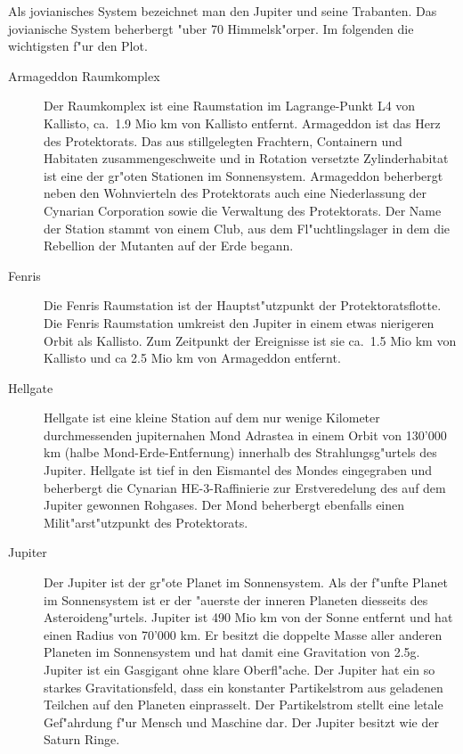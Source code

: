 
Als jovianisches System bezeichnet man den Jupiter und seine Trabanten. Das jovianische System beherbergt "uber 70  Himmelsk"orper. Im folgenden die wichtigsten f"ur den Plot.

\begin{description}
\item [Armageddon Raumkomplex] Der Raumkomplex ist eine Raumstation im Lagrange-Punkt L4 von Kallisto, ca.~1.9 Mio km         von Kallisto entfernt. Armageddon ist das Herz des Protektorats. Das aus stillgelegten Frachtern, Containern und
      Habitaten zusammengeschwei\3te und in Rotation versetzte Zylinderhabitat ist eine der gr"o\3ten Stationen im Sonnensystem. Armageddon beherbergt neben den Wohnvierteln des Protektorats auch eine Niederlassung der Cynarian Corporation sowie die Verwaltung des Protektorats. Der Name der Station stammt von einem Club, aus dem Fl"uchtlingslager in dem die Rebellion der Mutanten auf der Erde begann.
\item [Fenris] Die Fenris Raumstation ist der Hauptst"utzpunkt der Protektoratsflotte. Die Fenris Raumstation umkreist
      den Jupiter in einem etwas nierigeren Orbit als Kallisto. Zum Zeitpunkt der Ereignisse ist sie ca.~1.5 Mio km von Kallisto und ca 2.5 Mio km von Armageddon entfernt.
\item [Hellgate] Hellgate ist eine kleine Station auf dem nur wenige Kilometer durchmessenden jupiternahen Mond
      Adrastea in einem Orbit von 130'000 km (halbe Mond-Erde-Entfernung) innerhalb des Strahlungsg"urtels des Jupiter. Hellgate ist tief in den Eismantel des Mondes eingegraben und beherbergt die Cynarian HE-3-Raffinierie zur Erstveredelung des auf dem Jupiter gewonnen Rohgases. Der Mond beherbergt ebenfalls einen Milit"arst"utzpunkt des Protektorats.
\item [Jupiter] Der Jupiter ist der gr"o\3te Planet im Sonnensystem. Als der f"unfte Planet im Sonnensystem ist er der
      "au\3erste der inneren Planeten diesseits des Asteroideng"urtels. Jupiter ist 490 Mio km von der Sonne entfernt und hat einen Radius von 70'000 km. Er besitzt die doppelte Masse aller anderen Planeten im Sonnensystem und hat damit eine Gravitation von 2.5g. Jupiter ist ein Gasgigant ohne klare Oberfl"ache. Der Jupiter hat ein so starkes Gravitationsfeld, dass ein konstanter Partikelstrom aus geladenen Teilchen auf den Planeten einprasselt. Der Partikelstrom stellt eine letale Gef"ahrdung f"ur Mensch und Maschine dar. Der Jupiter besitzt wie der Saturn Ringe.

\end{description}
